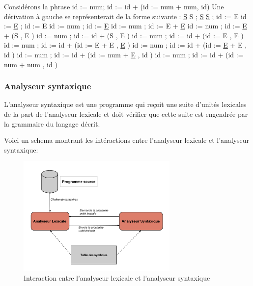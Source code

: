 \documentclass{article}
\begin{document}
Considérons la phrase id := num; id := id + (id := num + num, id)\newline
Une dérivation à gauche se représenterait de la forme suivante :\newline\newline
\underline{S}\newline
S ; \underline{S}\newline
\underline{S} ; id := E\newline
id := \underline{E} ; id := E\newline
id := num ; id := \underline{E}\newline
id := num ; id := E + \underline{E}\newline
id := num ; id := \underline{E} + (S , E )\newline
id := num ; id := id + (\underline{S} , E )\newline
id := num ; id := id + (id := \underline{E} , E )\newline
id := num ; id := id + (id := E + E , \underline{E} )\newline
id := num ; id := id + (id := \underline{E} + E , id )\newline
id := num ; id := id + (id := num + \underline{E} , id )\newline
id := num ; id := id + (id := num + num , id )\newline

\subsubsection{Analyseur syntaxique}

L'analyseur syntaxique est une programme qui reçoit une suite d'unités lexicales de la part de l'analyseur lexicale et doit vérifier que cette suite est engendrée par la grammaire du langage décrit.

Voici un schema montrant les intéractions entre l'analyseur lexicale et l'analyseur syntaxique:

\begin{figure}[h]
	\centering
		\includegraphics[width=0.70\textwidth]{interactionLexSynt.png}
	\caption{Interaction entre l'analyseur lexicale et l'analyseur syntaxique}
	\label{fig:interactionLexSynt}
\end{figure}\FloatBarrier
\end{document}
